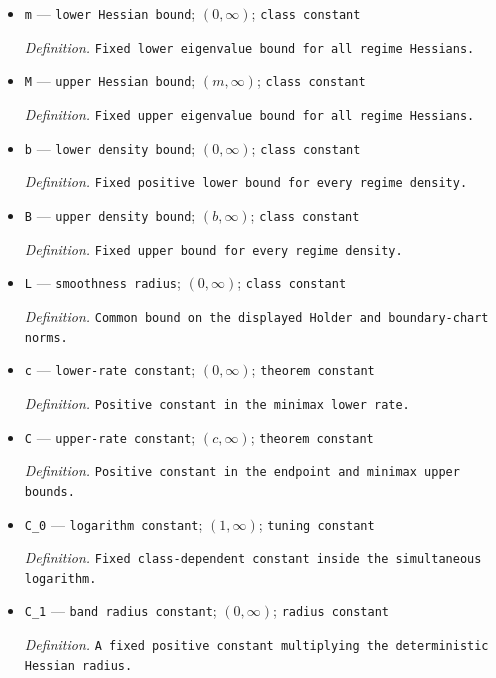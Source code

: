 \documentclass{article}
\begin{document}
\begin{itemize}
  \item \texttt{m} --- \texttt{lower Hessian bound}; \((0,\infty)\); \texttt{class constant}
  \par\smallskip\noindent\emph{Definition.} \texttt{Fixed lower eigenvalue bound for all regime Hessians.}
  \item \texttt{M} --- \texttt{upper Hessian bound}; \((m,\infty)\); \texttt{class constant}
  \par\smallskip\noindent\emph{Definition.} \texttt{Fixed upper eigenvalue bound for all regime Hessians.}
  \item \texttt{b} --- \texttt{lower density bound}; \((0,\infty)\); \texttt{class constant}
  \par\smallskip\noindent\emph{Definition.} \texttt{Fixed positive lower bound for every regime density.}
  \item \texttt{B} --- \texttt{upper density bound}; \((b,\infty)\); \texttt{class constant}
  \par\smallskip\noindent\emph{Definition.} \texttt{Fixed upper bound for every regime density.}
  \item \texttt{L} --- \texttt{smoothness radius}; \((0,\infty)\); \texttt{class constant}
  \par\smallskip\noindent\emph{Definition.} \texttt{Common bound on the displayed Holder and boundary-\allowbreak{}chart norms.}
  \item \texttt{c} --- \texttt{lower-\allowbreak{}rate constant}; \((0,\infty)\); \texttt{theorem constant}
  \par\smallskip\noindent\emph{Definition.} \texttt{Positive constant in the minimax lower rate.}
  \item \texttt{C} --- \texttt{upper-\allowbreak{}rate constant}; \((c,\infty)\); \texttt{theorem constant}
  \par\smallskip\noindent\emph{Definition.} \texttt{Positive constant in the endpoint and minimax upper bounds.}
  \item \texttt{C\_\allowbreak{}0} --- \texttt{logarithm constant}; \((1,\infty)\); \texttt{tuning constant}
  \par\smallskip\noindent\emph{Definition.} \texttt{Fixed class-\allowbreak{}dependent constant inside the simultaneous logarithm.}
  \item \texttt{C\_\allowbreak{}1} --- \texttt{band radius constant}; \((0,\infty)\); \texttt{radius constant}
  \par\smallskip\noindent\emph{Definition.} \texttt{A fixed positive constant multiplying the deterministic Hessian radius.}

\end{itemize}
\end{document}
